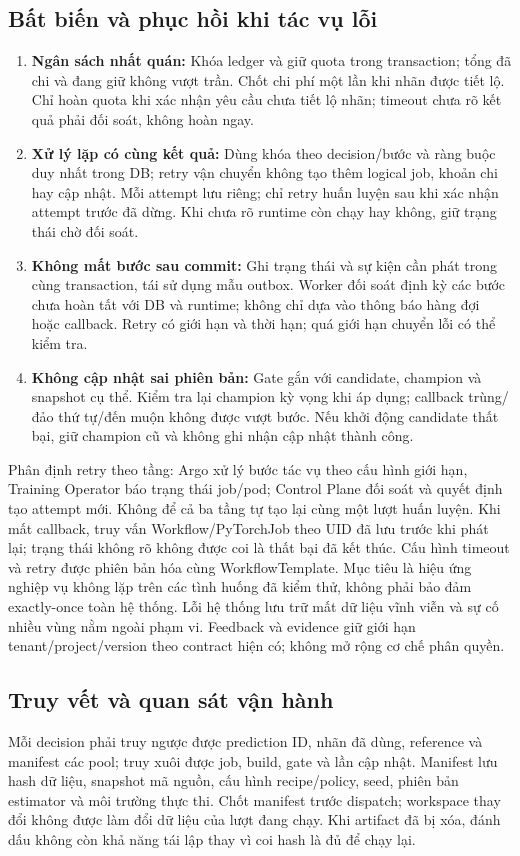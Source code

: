 \subsection{Bất biến và phục hồi khi tác vụ lỗi}
\begin{enumerate}
  \item \textbf{Ngân sách nhất quán:} Khóa ledger và giữ quota trong transaction; tổng đã chi và đang giữ không vượt trần. Chốt chi phí một lần khi nhãn được tiết lộ. Chỉ hoàn quota khi xác nhận yêu cầu chưa tiết lộ nhãn; timeout chưa rõ kết quả phải đối soát, không hoàn ngay.
  \item \textbf{Xử lý lặp có cùng kết quả:} Dùng khóa theo decision/bước và ràng buộc duy nhất trong DB; retry vận chuyển không tạo thêm logical job, khoản chi hay cập nhật. Mỗi attempt lưu riêng; chỉ retry huấn luyện sau khi xác nhận attempt trước đã dừng. Khi chưa rõ runtime còn chạy hay không, giữ trạng thái chờ đối soát.
  \item \textbf{Không mất bước sau commit:} Ghi trạng thái và sự kiện cần phát trong cùng transaction, tái sử dụng mẫu outbox. Worker đối soát định kỳ các bước chưa hoàn tất với DB và runtime; không chỉ dựa vào thông báo hàng đợi hoặc callback. Retry có giới hạn và thời hạn; quá giới hạn chuyển lỗi có thể kiểm tra.
  \item \textbf{Không cập nhật sai phiên bản:} Gate gắn với candidate, champion và snapshot cụ thể. Kiểm tra lại champion kỳ vọng khi áp dụng; callback trùng/đảo thứ tự/đến muộn không được vượt bước. Nếu khởi động candidate thất bại, giữ champion cũ và không ghi nhận cập nhật thành công.
\end{enumerate}
Phân định retry theo tầng: Argo xử lý bước tác vụ theo cấu hình giới hạn, Training Operator báo trạng thái job/pod; Control Plane đối soát và quyết định tạo attempt mới. Không để cả ba tầng tự tạo lại cùng một lượt huấn luyện. Khi mất callback, truy vấn Workflow/PyTorchJob theo UID đã lưu trước khi phát lại; trạng thái không rõ không được coi là thất bại đã kết thúc. Cấu hình timeout và retry được phiên bản hóa cùng WorkflowTemplate.
Mục tiêu là hiệu ứng nghiệp vụ không lặp trên các tình huống đã kiểm thử, không phải bảo đảm exactly-once toàn hệ thống. Lỗi hệ thống lưu trữ mất dữ liệu vĩnh viễn và sự cố nhiều vùng nằm ngoài phạm vi. Feedback và evidence giữ giới hạn tenant/project/version theo contract hiện có; không mở rộng cơ chế phân quyền.

\subsection{Truy vết và quan sát vận hành}
Mỗi decision phải truy ngược được prediction ID, nhãn đã dùng, reference và manifest các pool; truy xuôi được job, build, gate và lần cập nhật. Manifest lưu hash dữ liệu, snapshot mã nguồn, cấu hình recipe/policy, seed, phiên bản estimator và môi trường thực thi. Chốt manifest trước dispatch; workspace thay đổi không được làm đổi dữ liệu của lượt đang chạy. Khi artifact đã bị xóa, đánh dấu không còn khả năng tái lập thay vì coi hash là đủ để chạy lại.

